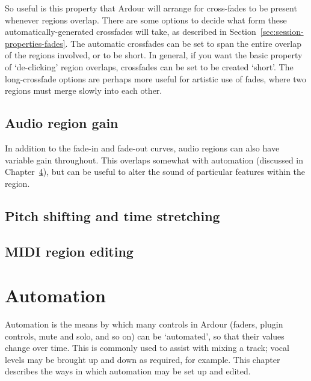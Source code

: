\documentclass[10pt,a4paper]{book}
\begin{document}
{So useful is this property that Ardour will arrange for cross-fades to
be present whenever regions overlap.  There are some options to decide
what form these automatically-generated crossfades will take, as
described in Section~\ref{sec:session-properties-fades}.  The
automatic crossfades can be set to span the entire overlap of the
regions involved, or to be short.  In general, if you want the basic
property of `de-clicking' region overlaps, crossfades can be set to be
created `short'.  The long-crossfade options are perhaps more useful for
artistic use of fades, where two regions must merge slowly into each
other.



\section{Audio region gain}

In addition to the fade-in and fade-out curves, audio regions can also
have variable gain throughout.  This overlaps somewhat with automation
(discussed in Chapter~\ref{ch:automation}), but can be useful to alter
the sound of particular features within the region.


\section{Pitch shifting and time stretching}

\section{MIDI region editing}






\chapter{Automation}
\label{ch:automation}

Automation is the means by which many controls in Ardour (faders,
plugin controls, mute and solo, and so on) can be `automated', so that
their values change over time.  This is commonly used to assist with
mixing a track; vocal levels may be brought up and down as required,
for example.  This chapter describes the ways in which automation may
be set up and edited.




}
\end{document}

